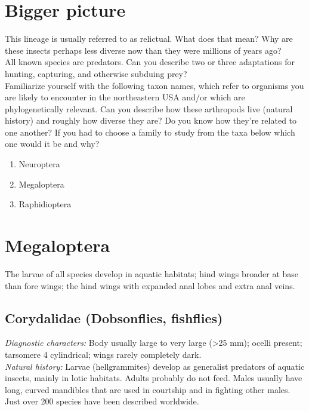 \documentclass[letterpaper, 11pt]{article}
\begin{document}
\section*{Bigger picture}
This lineage is usually referred to as relictual. What does that mean? Why are these insects perhaps less diverse now than they were millions of years ago?\\

\noindent{}All known species are predators. Can you describe two or three adaptations for hunting, capturing, and otherwise subduing prey?\\

\noindent{}Familiarize yourself with the following taxon names, which refer to organisms you are likely to encounter in the northeastern USA and/or which are phylogenetically relevant. Can you describe how these arthropods live (natural history) and roughly how diverse they are? Do you know how they're related to one another? If you had to choose a family to study from the taxa below which one would it be and why?
\begin{enumerate} 
\item Neuroptera  
\item Megaloptera
\item Raphidioptera
\end{enumerate}

\section{Megaloptera}
The larvae of all species develop in aquatic habitats;
 hind wings broader at base than fore wings; the hind wings with expanded anal lobes and extra anal veins.\\

\subsection{Corydalidae (Dobsonflies, fishflies)}

\noindent{}\textit{Diagnostic characters:} Body usually large to very large (\textgreater25 mm); ocelli present; tarsomere 4 cylindrical; wings rarely completely dark.\\

\noindent{}\textit{Natural history:} Larvae (hellgrammites) develop as generalist predators of aquatic insects, mainly in lotic habitats. Adults probably do not feed. Males usually have long, curved mandibles that are used in courtship and in fighting other males. Just over 200 species have been described worldwide.\\
\end{document}
